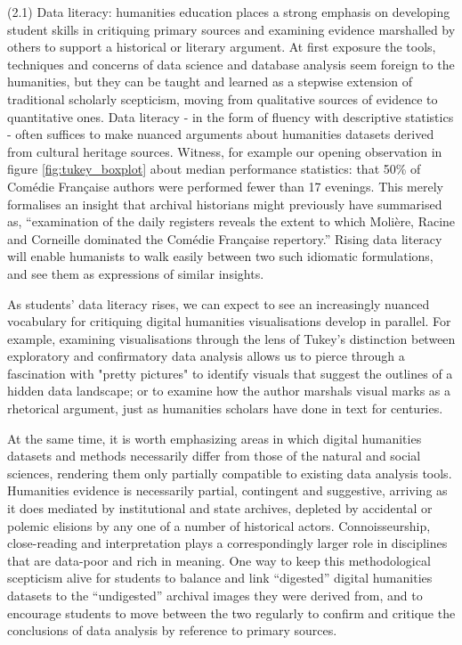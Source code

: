 \documentclass[	DIV=calc,%
							paper=a4,%
							fontsize=11pt,%
							twocolumn]{scrartcl}	 					%
\begin{document}
(2.1) Data literacy: humanities education places a strong emphasis on developing student skills in critiquing primary sources and examining evidence marshalled by others to support a historical or literary argument.  At first exposure the tools, techniques and concerns of data science and database analysis seem foreign to the humanities, but they can be taught and learned as a stepwise extension of traditional scholarly scepticism, moving from qualitative sources of evidence to quantitative ones.  Data literacy - in the form of fluency with descriptive statistics - often suffices to make nuanced arguments about humanities datasets derived from cultural heritage sources.  Witness, for example our opening observation in figure \ref{fig:tukey_boxplot} about median performance statistics: that 50\% of Comédie Française authors were performed fewer than 17 evenings.  This merely formalises an insight that archival historians might previously have summarised as, ``examination of the daily registers reveals the extent to which Molière, Racine and Corneille dominated the Comédie Française repertory.''  Rising data literacy will enable humanists to walk easily between two such idiomatic formulations, and see them as expressions of similar insights.

As students' data literacy rises, we can expect to see an increasingly nuanced vocabulary for critiquing digital humanities visualisations develop in parallel.  For example, examining visualisations through the lens of Tukey's distinction between exploratory and confirmatory data analysis allows us to pierce through a fascination with "pretty pictures" to identify visuals that suggest the outlines of a hidden data landscape; or to examine how the author marshals visual marks as a rhetorical argument, just as humanities scholars have done in text for centuries.

At the same time, it is worth emphasizing areas in which digital humanities datasets and methods necessarily differ from those of the natural and social sciences, rendering them only partially compatible to existing data analysis tools.  Humanities evidence is necessarily partial, contingent and suggestive, arriving as it does mediated by institutional and state archives, depleted by accidental or polemic elisions by any one of a number of historical actors.  Connoisseurship, close-reading and interpretation plays a correspondingly larger role in disciplines that are data-poor and rich in meaning.  One way to keep this methodological scepticism alive for students to balance and link ``digested'' digital humanities datasets to the ``undigested'' archival images they were derived from, and to encourage students to move between the two regularly to confirm and critique the conclusions of data analysis by reference to primary sources.
\end{document}

